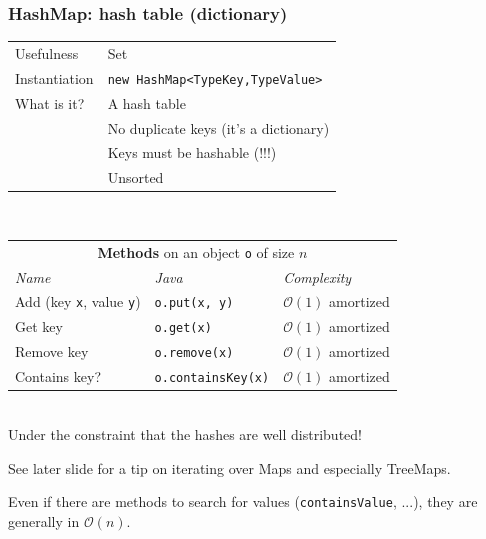 \documentclass[8pt,aspectratio=169]{beamer}
\begin{document}
\begin{frame}
\frametitle{HashMap: hash table (dictionary)}
\centering
\begin{tabular}{ll}
	Usefulness & Set\\
	Instantiation & \texttt{new HashMap<TypeKey,TypeValue>}\\
	What is it? & A hash table\\
	& \color{red} No duplicate keys (it's a dictionary)\\
	& \color{red} Keys must be hashable (!!!)\\
	& \color{red} Unsorted
	
\end{tabular}\\
\vspace{0.5cm}
\centering
\begin{tabular}{lll}
	\multicolumn{3}{c}{\textbf{Methods} on an object \texttt{o} of size $n$} \\
	\textit{Name} & \textit{Java} & \textit{Complexity} \\
	Add (key \texttt{x}, value \texttt{y})& \texttt{o.put(x, y)} & $\mathcal{O}(1)$ \color{orange} amortized\\
	Get key & \texttt{o.get(x)} & $\mathcal{O}(1)$ \color{orange} amortized\\
	Remove key & \texttt{o.remove(x)} & $\mathcal{O}(1)$ \color{orange} amortized\\
	Contains key? & \texttt{o.containsKey(x)} & $\mathcal{O}(1)$ \color{orange} amortized\\
\end{tabular}\\
\vspace{0.5cm}
\color{blue} Under the constraint that the hashes are well distributed!

\color{blue} See later slide for a tip on iterating over Maps and especially TreeMaps.

\color{red} Even if there are methods to search for values (\texttt{containsValue}, ...), they are generally in $\mathcal{O}(n)$.
\end{frame}
\end{document}
